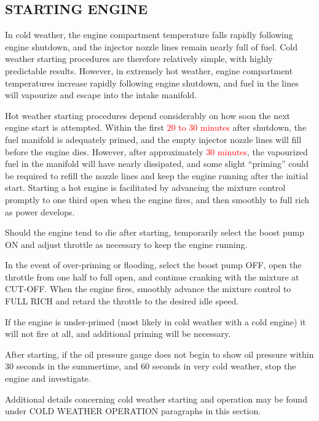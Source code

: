 \subsection{STARTING ENGINE}
In cold weather, the engine compartment temperature falls rapidly following engine shutdown, and the injector nozzle lines remain nearly full of fuel. Cold weather starting procedures are therefore relatively simple, with highly predictable results. However, in extremely hot weather, engine compartment temperatures increase rapidly following engine shutdown, and fuel in the lines will vapourize and escape into the intake manifold.

Hot weather starting procedures depend considerably on how soon the next engine start is attempted. Within the first \textcolor{red}{20 to 30 minutes} after shutdown, the fuel manifold is adequately primed, and the empty injector nozzle lines will fill before the engine dies. However, after approximately \textcolor{red}{30 minutes}, the vapourized fuel in the manifold will have nearly dissipated, and some slight ``priming'' could be required to refill the nozzle lines and keep the engine running after the initial start. Starting a hot engine is facilitated by advancing the mixture control promptly to one third open when the engine fires, and then smoothly to full rich as power develops.

Should the engine tend to die after starting, temporarily select the boost pump ON and adjust throttle as necessary to keep the engine running.

In the event of over-priming or flooding, select the boost pump OFF, open the throttle from one half to full open, and continue cranking with the mixture at CUT-OFF. When the engine fires, smoothly advance the mixture control to FULL RICH and retard the throttle to the desired idle speed.

If the engine is under-primed (most likely in cold weather with a cold engine) it will not fire at all, and additional priming will be necessary.

After starting, if the oil pressure gauge does not begin to show oil pressure within 30 seconds in the summertime, and 60 seconds in very cold weather, stop the engine and investigate.

\begin{Note}
  Additional details concerning cold weather starting and operation may be found under COLD WEATHER OPERATION
  paragraphs in this section.
  \end{Note}

